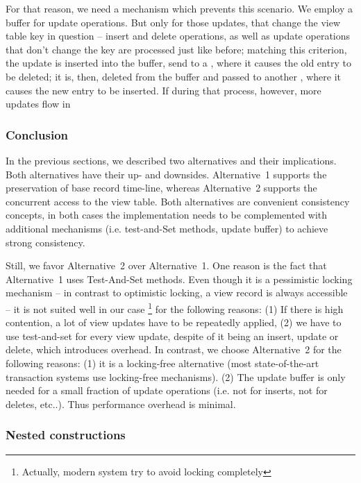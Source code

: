 For that reason, we need a mechanism which prevents this scenario. We 
employ a buffer for update operations. But only for those updates, that 
change the view table key in question -- insert and delete operations, 
as well as update operations that don't change the key are processed 
just like before; matching this criterion, the update is inserted into the 
buffer, send to a \VM, where it causes the old entry to be deleted; 
it is, then, deleted from the buffer and passed to another \VM, where it 
causes the new entry to be inserted. If during that process, however, more
updates flow in 




\subsubsection{Conclusion}
\label{subsubsec:conclusion} 

In the previous sections, we described two alternatives and their implications.
Both alternatives have their up- and downsides. Alternative~1 supports the 
preservation of base record time-line, whereas Alternative~2 supports the 
concurrent access to the view table. Both alternatives are convenient consistency
concepts, in both cases the implementation needs to be complemented with
additional mechanisms (i.e. test-and-Set methods, update buffer) to achieve
strong consistency. 

Still, we favor Alternative~2 over Alternative~1. One reason is the fact that
Alternative~1 uses Test-And-Set methods. Even though it is a pessimistic locking
mechanism -- in contrast to optimistic locking, a view record is always accessible --
it is not suited well in our case \footnote{Actually, modern system try to avoid locking completely} 
for the following reasons: (1) If there is high contention, a lot of view updates have
to be repeatedly applied, (2) we have to use test-and-set for every view update,
despite of it being an insert, update or delete, which introduces overhead. 
In contrast, we choose Alternative~2 for the following reasons: (1) it is a 
locking-free alternative (most state-of-the-art transaction systems use locking-free
mechanisms). (2) The update buffer is only needed for a small fraction of update
operations (i.e. not for inserts, not for deletes, etc..). Thus performance overhead
is minimal.





\subsubsection{Nested constructions}
\label{subsubsec:nested_constructions} 

